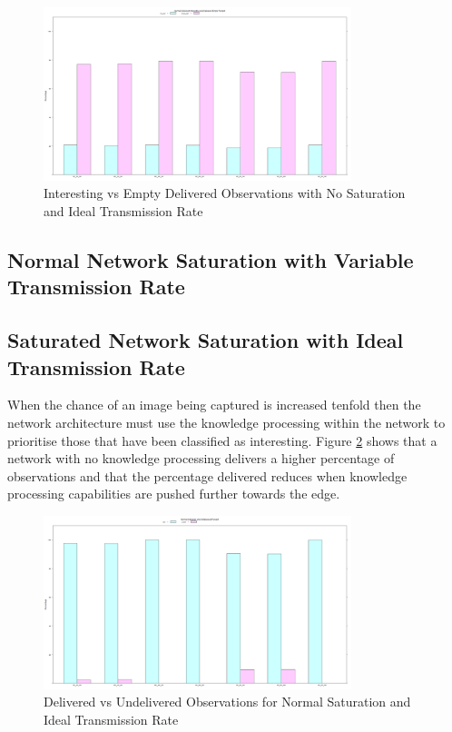 	\begin{figure}[h]
	\centering
	\includegraphics[width=0.8\textwidth]{Chap7/figures/plots/normal_ideal/intdelvemptdel_percent.png}
	\caption{Interesting vs Empty Delivered Observations with No Saturation and Ideal Transmission Rate}
	\label{fig:sim:res:norm:ideal:intempt}
	\end{figure}



\subsection{Normal Network Saturation with Variable Transmission Rate}

\subsection{Saturated Network Saturation with Ideal Transmission Rate}

When the chance of an image being captured is increased tenfold then the network architecture must use the knowledge processing within the network to prioritise those that have been classified as interesting. Figure \ref{fig:sim:res:saturated:ideal:delundel} shows that a network with no knowledge processing delivers a higher percentage of observations and that the percentage delivered reduces when knowledge processing capabilities are pushed further towards the edge.

	\begin{figure}[h]
	\centering
	\includegraphics[width=0.8\textwidth]{Chap7/figures/plots/normal_ideal/delvsundel_percent.png}
	\caption{Delivered vs Undelivered Observations for Normal Saturation and Ideal Transmission Rate}
	\label{fig:sim:res:saturated:ideal:delundel}
	\end{figure}

